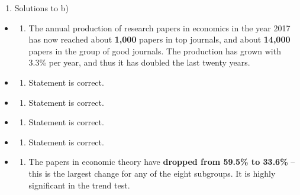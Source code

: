 \documentclass[
  12pt,
  oneside]{book}
\providecommand{\tightlist}{%
  \setlength{\itemsep}{0pt}\setlength{\parskip}{0pt}}
\theoremstyle{definition}
\theoremstyle{definition}
\theoremstyle{definition}
\theoremstyle{definition}
\theoremstyle{remark}
\begin{document}
\begin{enumerate}
\def\labelenumi{\alph{enumi})}
\setcounter{enumi}{1}
\tightlist
\item
  Solutions to b)
\end{enumerate}

\begin{itemize}
\item
  \begin{enumerate}
  \def\labelenumi{\roman{enumi})}
  \tightlist
  \item
    The annual production of research papers in economics in the year 2017 has now reached about \textbf{1,000} papers in top journals, and about \textbf{14,000} papers in the group of good journals. The production has grown with 3.3\% per year, and thus it has doubled the last twenty years.
  \end{enumerate}
\item
  \begin{enumerate}
  \def\labelenumi{\roman{enumi})}
  \setcounter{enumi}{1}
  \tightlist
  \item
    Statement is correct.
  \end{enumerate}
\item
  \begin{enumerate}
  \def\labelenumi{\roman{enumi})}
  \setcounter{enumi}{2}
  \tightlist
  \item
    Statement is correct.
  \end{enumerate}
\item
  \begin{enumerate}
  \def\labelenumi{\roman{enumi})}
  \setcounter{enumi}{3}
  \tightlist
  \item
    Statement is correct.
  \end{enumerate}
\item
  \begin{enumerate}
  \def\labelenumi{\alph{enumi})}
  \setcounter{enumi}{21}
  \tightlist
  \item
    Statement is correct.
  \end{enumerate}
\item
  \begin{enumerate}
  \def\labelenumi{\roman{enumi})}
  \setcounter{enumi}{5}
  \tightlist
  \item
    The papers in economic theory have \textbf{dropped from 59.5\% to 33.6\%} -- this is the largest change for any of the eight subgroups. It is highly significant in the trend test.
  \end{enumerate}
\end{itemize}
\end{document}
